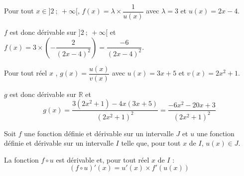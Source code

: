 \documentclass[french]{book}
\newcommand{\R}{\mathbb {R}}
\begin{document}
Pour tout $x\in]2~;~+\infty[$, $f(x)=\lambda\times \dfrac{1}{u(x)}$ avec $\lambda=3$ et $u(x)=2x-4$.

$f$ est donc dérivable sur $]2~;~+\infty[$ et $f(x)=3\times \left(-\dfrac{2}{(2x-4)^{2}}\right)=\dfrac{-6}{(2x-4)^{2}}$.

Pour tout réel $x$ , $g(x)=\dfrac{u(x)}{v(x)}$ avec $u(x)=3x+5$ et $v(x)=2x^{2}+1$.

$g$ est donc dérivable sur $\R$ et \[g(x)=\dfrac{3(2x^{2}+1)-4x(3x+5)}{(2x^{2}+1)^{2}}=\dfrac{-6x^2-20x+3}{(2x^{2}+1)^{2}}\]


\begin{prop}
% 
% 
% 
Soit $f$ une fonction définie et dérivable sur un intervalle $J$ et $u$ une fonction définie et dérivable sur un intervalle $I$ telle que, pour tout $x$ de $I$, $u(x)\in J$.

La fonction $f \circ u$ est dérivable et, pour tout réel $x$ de $I$ : \[(f\circ u)'(x)=u'(x)\times f'(u(x))\]
\end{prop}
\end{document}

